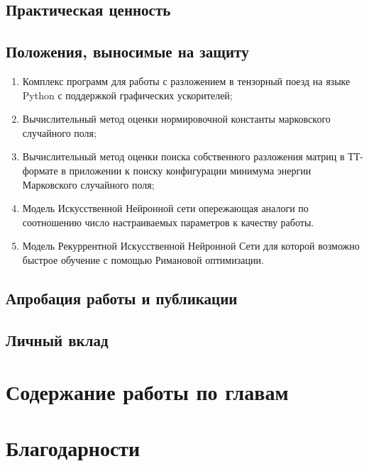 \subsection{Практическая ценность} \label{sec:intro-appliability}
\subsection{Положения, выносимые на защиту} \label{sec:intro-defended-topics}
\begin{enumerate}
	\item Комплекс программ для работы с разложением в тензорный поезд на языке Python с поддержкой графических ускорителей;
	\item Вычислительный метод оценки нормировочной константы марковского случайного поля;
	\item Вычислительный метод оценки поиска собственного разложения матриц в ТТ-формате в приложении к поиску конфигурации минимума энергии Марковского случайного поля;
	\item Модель Искусственной Нейронной сети опережающая аналоги по соотношению число настраиваемых параметров к качеству работы.
	\item Модель Рекуррентной Искусственной Нейронной Сети для которой возможно быстрое обучение с помощью Римановой оптимизации.
\end{enumerate}
\subsection{Апробация работы и публикации} \label{sec:intro-publications}
\subsection{Личный вклад} \label{sec:intro-publications}
\section{Содержание работы по главам} \label{sec:intro-detailed-table-of-contents}
\section{Благодарности} \label{sec:intro-acknowledgment}

\newcommand{\actuality}{}
\newcommand{\progress}{}
\newcommand{\aim}{{\textbf\aimTXT}}
\newcommand{\tasks}{\textbf{\tasksTXT}}
\newcommand{\novelty}{\textbf{\noveltyTXT}}
\newcommand{\influence}{\textbf{\influenceTXT}}
\newcommand{\methods}{\textbf{\methodsTXT}}
\newcommand{\defpositions}{\textbf{\defpositionsTXT}}
\newcommand{\reliability}{\textbf{\reliabilityTXT}}
\newcommand{\probation}{\textbf{\probationTXT}}
\newcommand{\contribution}{\textbf{\contributionTXT}}
\newcommand{\publications}{\textbf{\publicationsTXT}}

